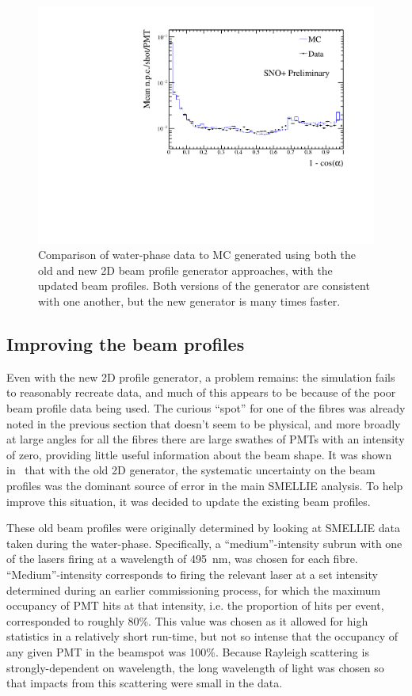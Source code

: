 \begin{figure}
    \centering
    \includegraphics[width=\linewidth]{5_SMELLIESimulation/images/data_mc_comparison_npe_vs_r_114018_109_use_f.pdf}
    \caption{Comparison of water-phase data to MC generated using both the old and new 2D beam profile generator approaches, with the updated beam profiles. Both versions of the generator are consistent with one another, but the new generator is many times faster.}
    \label{fig:data_generator_comp_new_profiles}
\end{figure}

\subsection{Improving the beam profiles}\label{sect:new_beam_profiles}
Even with the new 2D profile generator, a problem remains: the simulation fails to reasonably recreate data, and much of this appears to be because of the poor beam profile data being used. The curious ``spot'' for one of the fibres was already noted in the previous section that doesn't seem to be physical, and more broadly at large angles for all the fibres there are large swathes of PMTs with an intensity of zero, providing little useful information about the beam shape. It was shown in~\cite{turner_measurement_2022} that with the old 2D generator, the systematic uncertainty on the beam profiles was the dominant source of error in the main SMELLIE analysis. To help improve this situation, it was decided to update the existing beam profiles.

These old beam profiles were originally determined by looking at SMELLIE data taken during the water-phase. Specifically, a ``medium''-intensity subrun with one of the lasers firing at a wavelength of \SI{495}{\nano\metre}, was chosen for each fibre. ``Medium''-intensity corresponds to firing the relevant laser at a set intensity determined during an earlier commissioning process, for which the maximum occupancy of PMT hits at that intensity, i.e. the proportion of hits per event, corresponded to roughly 80\%. This value was chosen as it allowed for high statistics in a relatively short run-time, but not so intense that the occupancy of any given PMT in the beamspot was 100\%. Because Rayleigh scattering is strongly-dependent on wavelength, the long wavelength of light was chosen so that impacts from this scattering were small in the data.

